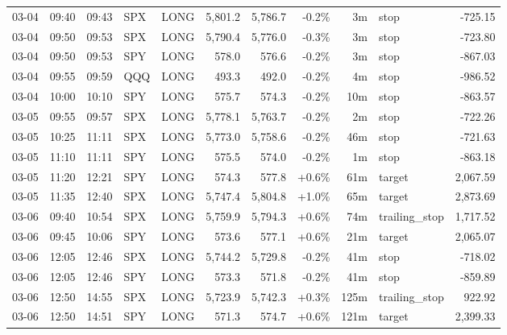\documentclass[11pt,a4paper,twoside]{article}
\begin{document}
\begin{center}
\begin{longtable}{>{\color{txtmain}}l l l l l r r r r >{\color{txtmain}}l r}
03-04 & 09:40 & 09:43 & SPX & LONG & 5,801.2 & 5,786.7 & \textcolor{lossred}{-0.2\%} & 3m & stop & \textcolor{lossred}{-725.15} \\
03-04 & 09:50 & 09:53 & SPX & LONG & 5,790.4 & 5,776.0 & \textcolor{lossred}{-0.3\%} & 3m & stop & \textcolor{lossred}{-723.80} \\
03-04 & 09:50 & 09:53 & SPY & LONG & 578.0 & 576.6 & \textcolor{lossred}{-0.2\%} & 3m & stop & \textcolor{lossred}{-867.03} \\
03-04 & 09:55 & 09:59 & QQQ & LONG & 493.3 & 492.0 & \textcolor{lossred}{-0.2\%} & 4m & stop & \textcolor{lossred}{-986.52} \\
03-04 & 10:00 & 10:10 & SPY & LONG & 575.7 & 574.3 & \textcolor{lossred}{-0.2\%} & 10m & stop & \textcolor{lossred}{-863.57} \\
03-05 & 09:55 & 09:57 & SPX & LONG & 5,778.1 & 5,763.7 & \textcolor{lossred}{-0.2\%} & 2m & stop & \textcolor{lossred}{-722.26} \\
03-05 & 10:25 & 11:11 & SPX & LONG & 5,773.0 & 5,758.6 & \textcolor{lossred}{-0.2\%} & 46m & stop & \textcolor{lossred}{-721.63} \\
03-05 & 11:10 & 11:11 & SPY & LONG & 575.5 & 574.0 & \textcolor{lossred}{-0.2\%} & 1m & stop & \textcolor{lossred}{-863.18} \\
03-05 & 11:20 & 12:21 & SPY & LONG & 574.3 & 577.8 & \textcolor{wingreen}{+0.6\%} & 61m & target & \textcolor{wingreen}{2,067.59} \\
03-05 & 11:35 & 12:40 & SPX & LONG & 5,747.4 & 5,804.8 & \textcolor{wingreen}{+1.0\%} & 65m & target & \textcolor{wingreen}{2,873.69} \\
03-06 & 09:40 & 10:54 & SPX & LONG & 5,759.9 & 5,794.3 & \textcolor{wingreen}{+0.6\%} & 74m & trailing\_stop & \textcolor{wingreen}{1,717.52} \\
03-06 & 09:45 & 10:06 & SPY & LONG & 573.6 & 577.1 & \textcolor{wingreen}{+0.6\%} & 21m & target & \textcolor{wingreen}{2,065.07} \\
03-06 & 12:05 & 12:46 & SPX & LONG & 5,744.2 & 5,729.8 & \textcolor{lossred}{-0.2\%} & 41m & stop & \textcolor{lossred}{-718.02} \\
03-06 & 12:05 & 12:46 & SPY & LONG & 573.3 & 571.8 & \textcolor{lossred}{-0.2\%} & 41m & stop & \textcolor{lossred}{-859.89} \\
03-06 & 12:50 & 14:55 & SPX & LONG & 5,723.9 & 5,742.3 & \textcolor{wingreen}{+0.3\%} & 125m & trailing\_stop & \textcolor{wingreen}{922.92} \\
03-06 & 12:50 & 14:51 & SPY & LONG & 571.3 & 574.7 & \textcolor{wingreen}{+0.6\%} & 121m & target & \textcolor{wingreen}{2,399.33} \\

\end{longtable}
\end{center}
\end{document}
